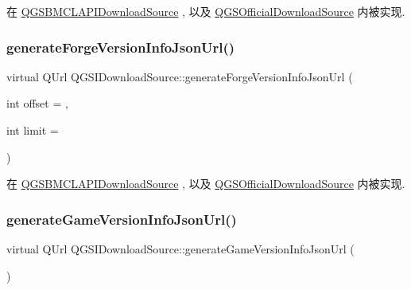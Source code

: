 在 \mbox{\hyperlink{class_q_g_s_b_m_c_l_a_p_i_download_source_a96abcb4f02ebed7e0c0952f23bef8d00}{Q\+G\+S\+B\+M\+C\+L\+A\+P\+I\+Download\+Source}} , 以及 \mbox{\hyperlink{class_q_g_s_official_download_source_a212e5a145ed60ce8868069d2e09a4d59}{Q\+G\+S\+Official\+Download\+Source}} 内被实现.

\mbox{\label{class_q_g_s_i_download_source_a26556a9ace422072f9ac996c5f054bc7}} 
\subsubsection{\texorpdfstring{generate\+Forge\+Version\+Info\+Json\+Url()}{generateForgeVersionInfoJsonUrl()}}
{\footnotesize\ttfamily virtual Q\+Url Q\+G\+S\+I\+Download\+Source\+::generate\+Forge\+Version\+Info\+Json\+Url (\begin{DoxyParamCaption}\item[{int}]{offset = {},  }\item[{int}]{limit = {} }\end{DoxyParamCaption})\hspace{0.3cm}{\ttfamily [pure virtual]}}



在 \mbox{\hyperlink{class_q_g_s_b_m_c_l_a_p_i_download_source_a4b503a690cd9d4488bee51def4cad440}{Q\+G\+S\+B\+M\+C\+L\+A\+P\+I\+Download\+Source}} , 以及 \mbox{\hyperlink{class_q_g_s_official_download_source_a752fd52c76112d3d76551a00b399220f}{Q\+G\+S\+Official\+Download\+Source}} 内被实现.

\mbox{\label{class_q_g_s_i_download_source_afd99abed3078c54f167269bc6122bb71}} 
\subsubsection{\texorpdfstring{generate\+Game\+Version\+Info\+Json\+Url()}{generateGameVersionInfoJsonUrl()}}
{\footnotesize\ttfamily virtual Q\+Url Q\+G\+S\+I\+Download\+Source\+::generate\+Game\+Version\+Info\+Json\+Url (\begin{DoxyParamCaption}{ }\end{DoxyParamCaption})\hspace{0.3cm}{\ttfamily [pure virtual]}}



